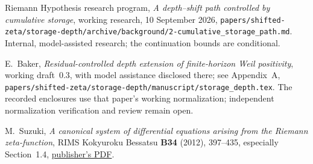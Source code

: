 Riemann Hypothesis research program,
\emph{A depth--shift path controlled by cumulative storage},
working research, 10 September 2026,
\nolinkurl{papers/shifted-zeta/storage-depth/archive/background/2-cumulative_storage_path.md}.
Internal, model-assisted research; the continuation bounds are
conditional.

E.~Baker, \emph{Residual-controlled depth extension of finite-horizon
Weil positivity}, working draft~0.3, with model assistance disclosed
there; see Appendix~A,
\nolinkurl{papers/shifted-zeta/storage-depth/manuscript/storage_depth.tex}.
The recorded enclosures use that paper's working normalization;
independent normalization verification and review remain open.

M.~Suzuki, \emph{A canonical system of differential equations arising
from the Riemann zeta-function}, RIMS Kokyuroku Bessatsu
\textbf{B34} (2012), 397--435, especially Section~1.4,
\href{https://www.kurims.kyoto-u.ac.jp/~kenkyubu/bessatsu/open/B34/pdf/B34_023.pdf}{publisher's PDF}.
